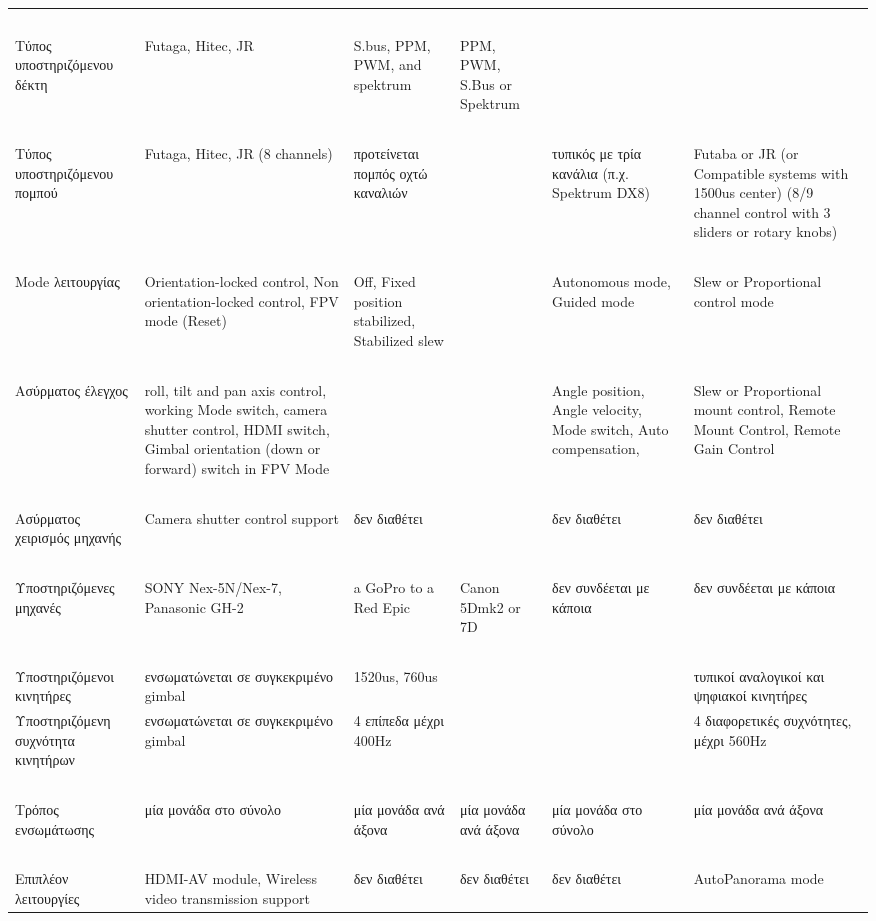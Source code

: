 \documentclass[a4paper, 12pt, twoside]{report}
\begin{document}
{{{{{{\begin{landscape}
\begin{longtable} { m{3cm} m{3cm} m{3cm} m{3cm} m{3cm} m{3cm} }
					\hdashline
					~\\
					Τύπος υποστηριζόμενου δέκτη & Futaga, Hitec, JR & S.bus, PPM, PWM, and spektrum & PPM, PWM, S.Bus or Spektrum & & \\
					\hdashline
					~\\
					Τύπος υποστηριζόμενου πομπού & Futaga, Hitec, JR (8 channels) & προτείνεται πομπός οχτώ καναλιών & & τυπικός με τρία κανάλια (π.χ. Spektrum DX8) & Futaba or JR (or Compatible systems with 1500us center) (8/9 channel control with 3 sliders or rotary knobs)\\
					\hdashline
					~\\
					Mode λειτουργίας & Orientation-locked control, Non orientation-locked control, FPV mode (Reset) & Off, Fixed position stabilized, Stabilized slew & & Autonomous mode, Guided mode & Slew or Proportional control mode\\
					\hdashline
					~\\
					Ασύρματος έλεγχος & roll, tilt and pan axis control, working Mode switch, camera shutter control, HDMI switch, Gimbal orientation (down or forward) switch in FPV Mode & & & Angle position, Angle velocity, Mode switch, Auto compensation, & Slew or Proportional mount control, Remote Mount Control, Remote Gain Control\\
					\hdashline
					~\\
					Ασύρματος χειρισμός μηχανής & Camera shutter control support & δεν διαθέτει & & δεν διαθέτει & δεν διαθέτει\\
					\hdashline
					~\\
					Υποστηριζόμενες μηχανές & SONY Nex-5N/Nex-7, Panasonic GH-2 & a GoPro to a Red Epic & Canon 5Dmk2 or 7D & δεν συνδέεται με κάποια & δεν συνδέεται με κάποια\\
					\hdashline
					~\\
					Υποστηριζόμενοι κινητήρες & ενσωματώνεται σε συγκεκριμένο gimbal & 1520us, 760us & & & τυπικοί αναλογικοί και ψηφιακοί κινητήρες\\
					Υποστηριζόμενη συχνότητα κινητήρων  & ενσωματώνεται σε συγκεκριμένο gimbal & 4 επίπεδα μέχρι 400Hz & & & 4 διαφορετικές συχνότητες, μέχρι 560Hz\\
					\hdashline
					~\\
					Τρόπος ενσωμάτωσης & μία μονάδα στο σύνολο & μία μονάδα ανά άξονα & μία μονάδα ανά άξονα & μία μονάδα στο σύνολο & μία μονάδα ανά άξονα\\
					\hdashline
					~\\
					Επιπλέον λειτουργίες & HDMI-AV module, Wireless video transmission support & δεν διαθέτει & δεν διαθέτει & δεν διαθέτει & AutoPanorama mode \\

\end{longtable}
\end{landscape}}}}}}}
\end{document}
